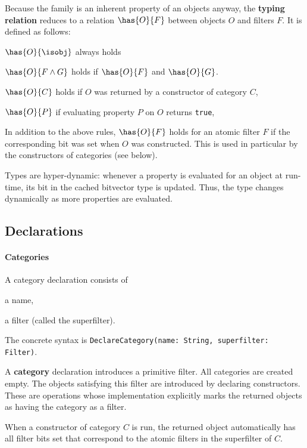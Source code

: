 Because the family is an inherent property of an objects anyway, the \textbf{typing relation} reduces to a relation $\has{O}{F}$ between objects $O$ and filters $F$.
It is defined as follows:
\begin{compactitem}
  \item $\has{O}{\isobj}$ always holds
  \item $\has{O}{F\wedge G}$ holds if $\has{O}{F}$ and $\has{O}{G}$.
  \item $\has{O}{C}$ holds if $O$ was returned by a constructor of category $C$,
  \item $\has{O}{P}$ if evaluating property $P$ on $O$ returns \lstinline|true|,
  \item In addition to the above rules, $\has{O}{F}$ holds for an atomic filter $F$ if the corresponding bit was set when $O$ was constructed.
  This is used in particular by the constructors of categories (see below).
\end{compactitem}

Types are hyper-dynamic: whenever a property is evaluated for an object at run-time, its bit in the cached bitvector type is updated.
Thus, the type changes dynamically as more properties are evaluated.

\subsection{Declarations}

\paragraph{Categories}
A category declaration consists of
\begin{compactitem}
  \item a name,
  \item a filter (called the superfilter).
\end{compactitem}
The concrete syntax is \lstinline|DeclareCategory(name: String, superfilter: Filter)|.

A \textbf{category} declaration introduces a primitive filter.
All categories are created empty.
The objects satisfying this filter are introduced by declaring constructors.
These are operations whose implementation explicitly marks the returned objects as having the category as a filter.

When a constructor of category $C$ is run, the returned object automatically has all filter bits set that correspond to the atomic filters in the superfilter of $C$.

